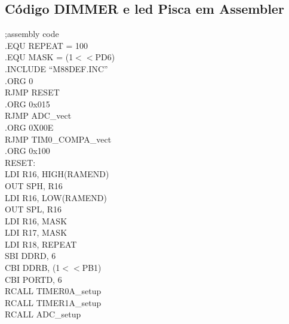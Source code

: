 \documentclass[titlepage, a4paper, 10pt, reqno, openany]{report}
\begin{document}
\subsection{C\'{o}digo DIMMER e led Pisca em Assembler}
\begin{minipage}[t]{.45\linewidth}
	\scriptsize
	;assembly code \\
	.EQU REPEAT = 100 \\
	.EQU MASK = (1$<<$PD6) \\
	.INCLUDE \textquotedblleft M88DEF.INC\textquotedblright \\
	.ORG 0 \\
	\hspace*{.5cm}	RJMP RESET \\
	.ORG 0x015 \\
	\hspace*{.5cm}	RJMP ADC\_vect \\
	.ORG 0X00E \\
	\hspace*{.5cm}	RJMP TIM0\_COMPA\_vect \\
	.ORG 0x100 \\
	RESET: \\
	\hspace*{.5cm}	LDI R16, HIGH(RAMEND) \\
	\hspace*{.5cm}	OUT SPH, R16 \\
	\hspace*{.5cm}	LDI R16, LOW(RAMEND) \\
	\hspace*{.5cm}	OUT SPL, R16 \\
	\hspace*{.5cm}	LDI R16, MASK \\
	\hspace*{.5cm}	LDI R17, MASK \\
	\hspace*{.5cm}	LDI R18, REPEAT \\
	\hspace*{.5cm}	SBI DDRD, 6 \\
	\hspace*{.5cm}	CBI DDRB, (1$<<$PB1) \\
	\hspace*{.5cm}	CBI PORTD, 6 \\
	\hspace*{.5cm}	RCALL TIMER0A\_setup \\
	\hspace*{.5cm}	RCALL TIMER1A\_setup \\
	\hspace*{.5cm}	RCALL ADC\_setup \\

\end{minipage}
\end{document}
